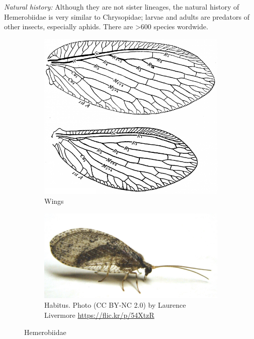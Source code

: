 \documentclass[letterpaper, 11pt]{article}
\begin{document}
\noindent{}\textit{Natural history:} Although they are not sister lineages, the natural history of Hemerobiidae is very similar to Chrysopidae; larvae and adults are predators of other insects, especially aphids. There are \textgreater{}600 species wordwide.

\begin{figure}[ht!]
    \centering
    \begin{subfigure}[ht!]{0.34\textwidth}
        \includegraphics[width=\textwidth]{HemerobiidWing}
        \caption{Wings \citep[][Fig. 153]{comstock1918wings}}
        \label{fig:hemerobiid1}
    \end{subfigure}
    \qquad
    \begin{subfigure}[ht!]{0.5\textwidth}
        \includegraphics[width=\textwidth]{HemerobiidHabitus}
        \caption{Habitus. Photo (CC BY-NC 2.0) by Laurence Livermore \url{https://flic.kr/p/54XtzR}}
        \label{fig:hemerobiid2}
    \end{subfigure}
    \caption{Hemerobiidae}\label{fig:hemerobiids}
\end{figure}
\end{document}
